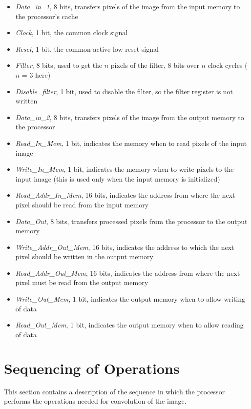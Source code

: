 \documentclass[11pt,a4paper]{article}
\begin{document}
\begin{itemize}
		\item \textit{Data\_in\_1}, 8 bits, transfers pixels of the image from the input memory to the processor's cache
		\item \textit{Clock}, 1 bit, the common clock signal
		\item \textit{Reset}, 1 bit, the common active low reset signal
		\item \textit{Filter}, 8 bits, used to get the $n$ pixels of the filter, 8 bits over $n$ clock cycles ($n$ = 3 here)
		\item \textit{Disable\_filter}, 1 bit, used to disable the filter, so the filter register is not written
		\item \textit{Data\_in\_2}, 8 bits, transfers pixels of the image from the output memory to the processor
		\item \textit{Read\_In\_Mem}, 1 bit, indicates the memory when to read pixels of the input image
		\item \textit{Write\_In\_Mem}, 1 bit, indicates the memory when to write pixels to the input image (this is used only when the input memory is initialized)
		\item \textit{Read\_Addr\_In\_Mem}, 16 bits, indicates the address from where the next pixel should be read from the input memory
		\item \textit{Data\_Out}, 8 bits, transfers processed pixels from the processor to the output memory
		\item \textit{Write\_Addr\_Out\_Mem}, 16 bits, indicates the address to which the next pixel should be written in the output memory
		\item \textit{Read\_Addr\_Out\_Mem}, 16 bits, indicates the address from where the next pixel must be read from the output memory
		\item \textit{Write\_Out\_Mem}, 1 bit, indicates the output memory when to allow writing of data
		\item \textit{Read\_Out\_Mem}, 1 bit, indicates the output memory when to allow reading of data
\end{itemize}

\FloatBarrier
\section{Sequencing of Operations}
\label{sec:sequencing}

This section contains a description of the sequence in which the processor performs the operations needed for convolution of the image. 
\end{document}
